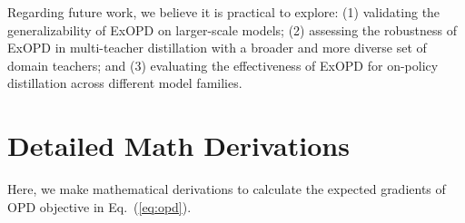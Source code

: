 \documentclass{article} %
\begin{document}
Regarding future work, we believe it is practical to explore: (1) validating the generalizability of ExOPD on larger-scale models; (2) assessing the robustness of ExOPD in multi-teacher distillation with a broader and more diverse set of domain teachers; and (3) evaluating the effectiveness of ExOPD for on-policy distillation across different model families.

\newpage 



\clearpage
\appendix



\section{Detailed Math Derivations}
\label{appendix: math derivations}
Here, we make mathematical derivations to calculate the expected gradients of OPD objective in Eq.~(\ref{eq:opd}).
\end{document}
